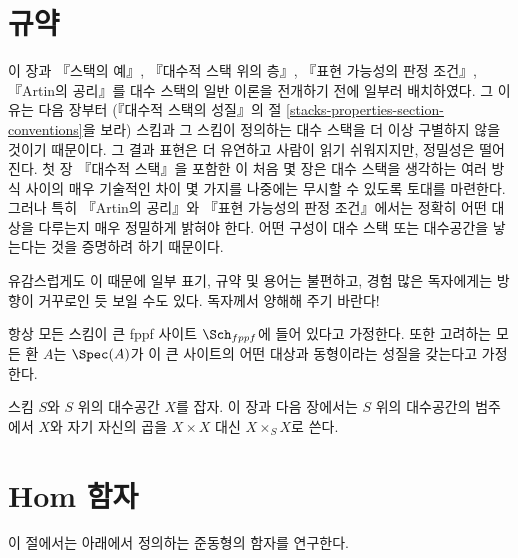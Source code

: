 \section{규약}
\label{section-conventions}

\noindent
이 장과 『스택의 예』, 『대수적 스택 위의 층』,
『표현 가능성의 판정 조건』, 『Artin의 공리』를 대수 스택의
일반 이론을 전개하기 전에 일부러 배치하였다. 그 이유는 다음 장부터
(『대수적 스택의 성질』의 절
\ref{stacks-properties-section-conventions}을 보라)
스킴과 그 스킴이 정의하는 대수 스택을 더 이상 구별하지 않을 것이기
때문이다. 그 결과 표현은 더 유연하고 사람이 읽기 쉬워지지만,
정밀성은 떨어진다. 첫 장 『대수적 스택』을 포함한 이 처음 몇 장은
대수 스택을 생각하는 여러 방식 사이의 매우 기술적인 차이 몇 가지를
나중에는 무시할 수 있도록 토대를 마련한다.
그러나 특히 『Artin의 공리』와 『표현 가능성의 판정 조건』에서는
정확히 어떤 대상을 다루는지 매우 정밀하게 밝혀야 한다. 어떤 구성이
대수 스택 또는 대수공간을 낳는다는 것을 증명하려 하기 때문이다.

\medskip\noindent
유감스럽게도 이 때문에 일부 표기, 규약 및 용어는 불편하고,
경험 많은 독자에게는 방향이 거꾸로인 듯 보일 수도 있다.
독자께서 양해해 주기 바란다!

\medskip\noindent
항상 모든 스킴이 큰 fppf 사이트 $\Sch_{fppf}$에 들어 있다고
가정한다. 또한 고려하는 모든 환 $A$는 $\Spec(A)$가 이 큰 사이트의
어떤 대상과 동형이라는 성질을 갖는다고 가정한다.

\medskip\noindent
스킴 $S$와 $S$ 위의 대수공간 $X$를 잡자. 이 장과 다음 장에서는
$S$ 위의 대수공간의 범주에서 $X$와 자기 자신의 곱을
$X \times X$ 대신 $X \times_S X$로 쓴다.















\section{Hom 함자}
\label{section-hom}

\noindent
이 절에서는 아래에서 정의하는 준동형의 함자를 연구한다.

